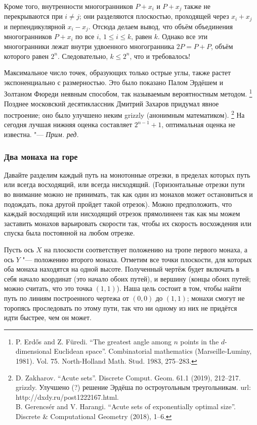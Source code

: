 \documentclass[twoside]{book}
\newenvironment{addedbytheeditors}{\par\medskip\small
}{\par\addvspace{\medskipamount}} %
\begin{document}
Кроме того, внутренности многогранников $P+x_i$ и $P+x_j$ также не перекрываются при $i\ne j$;
они разделяются плоскостью, проходящей через $x_i+x_j$ и перпендикулярной $x_i-x_j$.
Отсюда делаем вывод, что объём объединения многогранников $P+x_i$ по
все $i$, $1 \le i \le k$, равен $k$.
Однако все эти многогранники лежат внутри удвоенного многогранника $2P = P+P$, объём которого равен $2^n$. Следовательно, $k \le 2^n$, что и требовалось!
\heart

\begin{addedbytheeditors}
Максимальное число точек, образующих только острые углы, также растет
экспоненциально с размерностью.
Это было показано Палом Эрдёшем и Золтаном Фюреди неявным способом, так
называемым вероятностным методом.%
\footnote{P. Erdős and Z. Füredi. “The greatest angle among $n$ points in
the $d$-dimensional Euclidean space”. Combinatorial mathematics
(Marseille-Luminy, 1981). Vol. 75. North-Holland Math. Stud. 1983,
275--283.}
Позднее московский десятиклассник Дмитрий Захаров придумал явное
построение;
оно было улучшено неким grizzly (анонимным математиком).
\footnote{D. Zakharov. “Acute sets”. Discrete Comput. Geom. 61.1 (2019),
212--217.\\
grizzly. Улучшено (?) решение Эрдёша по остроугольным треугольникам. url:
http://dxdy.ru/post1222167.html.\\
B. Gerencsér and V. Harangi. “Acute sets of exponentially optimal size”.
Discrete \& Computational Geometry (2018), 1--6.}
На сегодня лучшая нижняя оценка составляет $2^{n-1}+1$, оптимальная оценка
не известна.
"--- \emph{Прим. ред.}
\end{addedbytheeditors}

\subsubsection*{Два монаха на горе}

Давайте разделим каждый путь на монотонные отрезки, в пределах которых
путь или всегда восходящий, или всегда нисходящий.
(Горизонтальные
отрезки пути во внимание можно не принимать, так как один из монахов
может остановиться и подождать, пока другой пройдет такой отрезок).
Можно предположить, что каждый восходящий или нисходящий отрезок
прямолинеен
так как мы можем заставить монахов
варьировать скорости так, чтобы их скорость восхождения или спуска
была постоянной на любом отрезке.

Пусть ось $X$ на плоскости соответствует положению на тропе первого
монаха, а ось $Y$ "--- положению второго монаха.
Отметим все точки
плоскости, для которых оба монаха находятся на одной высоте.
Полученный чертёж будет включать в себя начало координат (это начало
обоих путей), и вершину (концы обоих путей; можно считать, что это
точка $(1,1)$).
Наша цель состоит в том, чтобы найти путь по линиям
построенного чертежа от $(0,0)$ до $(1,1)$; монахи смогут не торопясь
проследовать по этому пути, так что ни одному из них не придётся идти
быстрее, чем он может.
\end{document}
